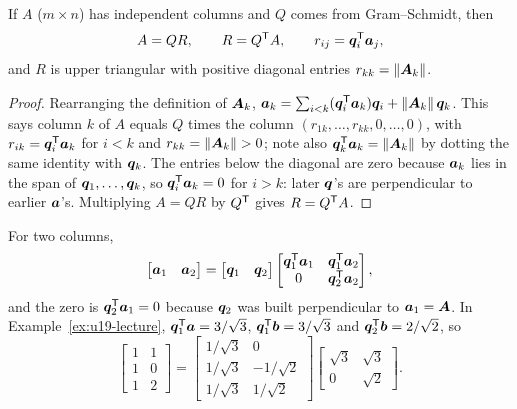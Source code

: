 \begin{theorem}\label{thm:u19-qr}
If $A$ ($m\times n$) has independent columns and $Q$ comes from Gram--Schmidt, then
\[
  A=QR,\qquad R=Q^{\mathsf{T}} A,\qquad r_{ij}=\boldsymbol{q}_i^{\mathsf{T}}\boldsymbol{a}_j ,
\]
and $R$ is upper triangular with positive diagonal entries $r_{kk}=\|\boldsymbol{A}_k\|$.
\end{theorem}

\begin{proof}
Rearranging the definition of $\boldsymbol{A}_k$,
$\boldsymbol{a}_k=\sum_{i<k}(\boldsymbol{q}_i^{\mathsf{T}}\boldsymbol{a}_k)\boldsymbol{q}_i+\|\boldsymbol{A}_k\|\,\boldsymbol{q}_k$. This says column $k$
of $A$ equals $Q$ times the column $(r_{1k},\dots,r_{kk},0,\dots,0)$, with
$r_{ik}=\boldsymbol{q}_i^{\mathsf{T}}\boldsymbol{a}_k$ for $i<k$ and $r_{kk}=\|\vb{A}_k\|>0$; note also
$\boldsymbol{q}_k^{\mathsf{T}}\boldsymbol{a}_k=\|\boldsymbol{A}_k\|$ by dotting the same identity with $\boldsymbol{q}_k$. The entries
below the diagonal are zero because $\boldsymbol{a}_k$ lies in the span of
$\boldsymbol{q}_1,\dots,\boldsymbol{q}_k$, so $\boldsymbol{q}_i^{\mathsf{T}}\boldsymbol{a}_k=0$ for $i>k$: later $\boldsymbol{q}$'s are
perpendicular to earlier $\boldsymbol{a}$'s. Multiplying $A=QR$ by $Q^{\mathsf{T}}$ gives $R=Q^{\mathsf{T}} A$.
\end{proof}

For two columns,
\[
  \begin{bmatrix}\boldsymbol{a}_1&\boldsymbol{a}_2\end{bmatrix}
  =\begin{bmatrix}\boldsymbol{q}_1&\boldsymbol{q}_2\end{bmatrix}
  \begin{bmatrix}\boldsymbol{q}_1^{\mathsf{T}}\boldsymbol{a}_1&\boldsymbol{q}_1^{\mathsf{T}}\boldsymbol{a}_2\\0&\boldsymbol{q}_2^{\mathsf{T}}\boldsymbol{a}_2\end{bmatrix},
\]
and the zero is $\boldsymbol{q}_2^{\mathsf{T}}\boldsymbol{a}_1=0$ because $\boldsymbol{q}_2$ was built perpendicular to
$\boldsymbol{a}_1=\boldsymbol{A}$. In Example~\ref{ex:u19-lecture}, $\boldsymbol{q}_1^{\mathsf{T}}\boldsymbol{a}=3/\sqrt3$,
$\boldsymbol{q}_1^{\mathsf{T}}\boldsymbol{b}=3/\sqrt3$ and $\boldsymbol{q}_2^{\mathsf{T}}\boldsymbol{b}=2/\sqrt2$, so
\[
  \begin{bmatrix}1&1\\1&0\\1&2\end{bmatrix}
  =\begin{bmatrix}1/\sqrt3&0\\1/\sqrt3&-1/\sqrt2\\1/\sqrt3&1/\sqrt2\end{bmatrix}
   \begin{bmatrix}\sqrt3&\sqrt3\\0&\sqrt2\end{bmatrix}.
\]

